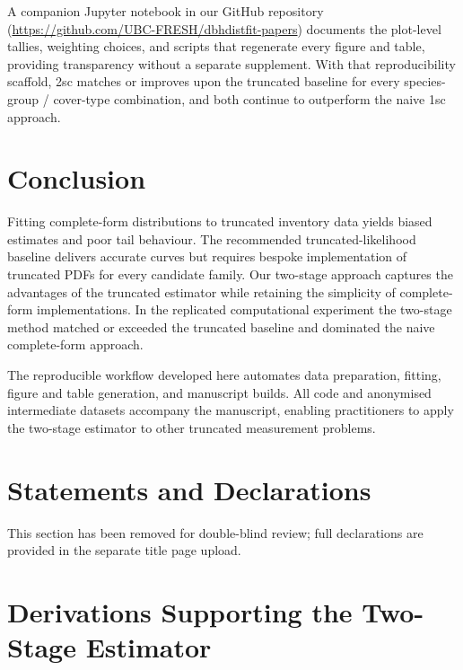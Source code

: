\documentclass[12pt]{article}
\begin{document}
A companion Jupyter notebook in our GitHub repository (\url{https://github.com/UBC-FRESH/dbhdistfit-papers}) documents the plot-level tallies, weighting choices, and scripts that regenerate every figure and table, providing transparency without a separate supplement. With that reproducibility scaffold, 2sc matches or improves upon the truncated baseline for every species-group / cover-type combination, and both continue to outperform the naive 1sc approach.

\section{Conclusion}

\label{sec:conclusion}

Fitting complete-form distributions to truncated inventory data yields biased estimates and poor tail behaviour. The recommended truncated-likelihood baseline delivers accurate curves but requires bespoke implementation of truncated PDFs for every candidate family. Our two-stage approach captures the advantages of the truncated estimator while retaining the simplicity of complete-form implementations. In the replicated computational experiment the two-stage method matched or exceeded the truncated baseline and dominated the naive complete-form approach.

The reproducible workflow developed here automates data preparation, fitting, figure and table generation, and manuscript builds. All code and anonymised intermediate datasets accompany the manuscript, enabling practitioners to apply the two-stage estimator to other truncated measurement problems.


\section*{Statements and Declarations}
This section has been removed for double-blind review; full declarations are provided in the separate title page upload.

\appendix
\section{Derivations Supporting the Two-Stage Estimator}
\end{document}
